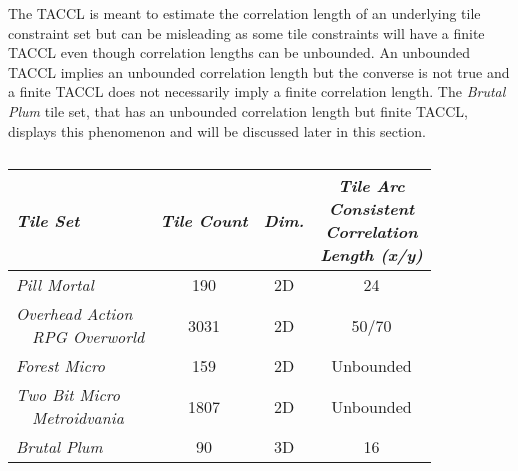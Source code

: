 The TACCL is meant to estimate the correlation length of an underlying tile constraint set but can be misleading as some
tile constraints will have a finite TACCL even though correlation lengths can be unbounded.
An unbounded TACCL implies an unbounded correlation length but the converse is not true and a finite TACCL
does not necessarily imply a finite correlation length.
The \textit{Brutal Plum} tile set, that has an unbounded correlation length but finite TACCL,
displays this phenomenon and will be discussed later in this section.

%


\begin{table}[h]
  \caption{ }
  \label{table:tilesets}
  \centering
  \begin{tabular}[t]{lccc}
    \hline
     \textit{Tile Set} & \textit{Tile Count} & \textit{Dim.} & \specialcellCenter{\textit{Tile Arc} \\ \textit{Consistent} \\ \textit{Correlation} \\ \textit{Length (x/y)}} \\
     \hline
     \textit{Pill Mortal} & 190 & 2D & 24 \\
     \specialcell{\textit{Overhead Action} \\ \ \ \textit{RPG Overworld}} \cite{LUNARSIGNALS_oarpgo} & 3031 & 2D & 50/70 \\
     \textit{Forest Micro} \cite{ThKaspar_micro} & 159 & 2D & Unbounded  \\
     \specialcell{\textit{Two Bit Micro} \\ \ \ \textit{Metroidvania} } \cite{0x72_2bmmv} & 1807 & 2D & Unbounded  \\
     \textit{Brutal Plum} & 90 & 3D & 16 \\
     \hline
  \end{tabular}
\end{table}


